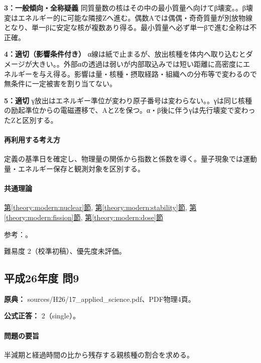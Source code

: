 \noindent\textbf{3：一般傾向・全称疑義} 同質量数の核はその中の最小質量へ向けてβ壊変。。β壊変はエネルギー的に可能な隣接Zへ進む。偶数Aでは偶偶・奇奇質量が別放物線となり、単一βに安定な核が複数あり得る。最小質量へ必ず単一βで進む全称は不正確。\par

\noindent\textbf{4：適切（影響条件付き）} α線は紙で止まるが、放出核種を体内へ取り込むとダメージが大きい。。外部αの透過は弱いが内部取込みでは短い距離に高密度にエネルギーを与え得る。影響は量・核種・摂取経路・組織への分布等で変わるので無条件に一定被害を割り当てない。\par

\noindent\textbf{5：適切} γ放出はエネルギー準位が変わり原子番号は変わらない。。γは同じ核種の励起準位からの電磁遷移で、AとZを保つ。α・β後に伴うγは先行壊変で変わったZと区別する。\par

\paragraph{再利用する考え方} 定義の基準日を確定し、物理量の関係から指数と係数を導く。量子現象では運動量・エネルギー保存と観測対象を区別する。

\paragraph{共通理論} \hyperref[theory:modern:nuclear]{第\ref*{theory:modern:nuclear}節}, \hyperref[theory:modern:stability]{第\ref*{theory:modern:stability}節}, \hyperref[theory:modern:fission]{第\ref*{theory:modern:fission}節}, \hyperref[theory:modern:dose]{第\ref*{theory:modern:dose}節}

\par 参考：\cite{modern_mit_nuclear,modern_mit_mass,modern_doublebeta,modern_fastfission,modern_alpha,modern_series}。

\par 難易度 2（校準初稿）、優先度未評価。

\subsection{平成26年度 問9}
\label{q:h26-reg-applied-09}

\noindent\textbf{原典：} sources/H26/17\_applied\_science.pdf、PDF物理4頁。

\textbf{公式正答：} 2（single）。

\paragraph{問題の要旨} 半減期と経過時間の比から残存する親核種の割合を求める。


